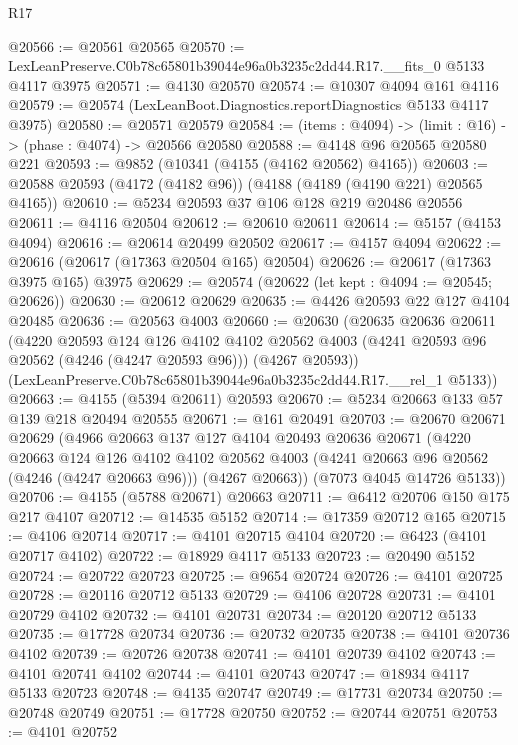 \begin{lexlean}{R17}
\begin{coremodule}
@20566 := @20561 @20565
@20570 := LexLeanPreserve.C0b78c65801b39044e96a0b3235c2dd44.R17.__fits_0 @5133 @4117 @3975
@20571 := @4130 @20570
@20574 := @10307 @4094 @161 @4116
@20579 := @20574 (LexLeanBoot.Diagnostics.reportDiagnostics @5133 @4117 @3975)
@20580 := @20571 @20579
@20584 := (items : @4094) -> (limit : @16) -> (phase : @4074) -> @20566 @20580
@20588 := @4148 @96 @20565 @20580 @221
@20593 := @9852 (@10341 (@4155 (@4162 @20562) @4165))
@20603 := @20588 @20593 (@4172 (@4182 @96)) (@4188 (@4189 (@4190 @221) @20565 @4165))
@20610 := @5234 @20593 @37 @106 @128 @219 @20486 @20556
@20611 := @4116 @20504
@20612 := @20610 @20611
@20614 := @5157 (@4153 @4094)
@20616 := @20614 @20499 @20502
@20617 := @4157 @4094
@20622 := @20616 (@20617 (@17363 @20504 @165) @20504)
@20626 := @20617 (@17363 @3975 @165) @3975
@20629 := @20574 (@20622 (let kept : @4094 := @20545; @20626))
@20630 := @20612 @20629
@20635 := @4426 @20593 @22 @127 @4104 @20485
@20636 := @20563 @4003
@20660 := @20630
    (@20635
      @20636
      @20611
      (@4220
        @20593
        @124
        @126
        @4102
        @4102
        @20562
        @4003
        (@4241 @20593 @96 @20562 (@4246 (@4247 @20593 @96)))
        (@4267 @20593))
      (LexLeanPreserve.C0b78c65801b39044e96a0b3235c2dd44.R17.__rel_1 @5133))
@20663 := @4155 (@5394 @20611) @20593
@20670 := @5234 @20663 @133 @57 @139 @218 @20494 @20555
@20671 := @161 @20491
@20703 := @20670
    @20671
    @20629
    (@4966
      @20663
      @137
      @127
      @4104
      @20493
      @20636
      @20671
      (@4220
        @20663
        @124
        @126
        @4102
        @4102
        @20562
        @4003
        (@4241 @20663 @96 @20562 (@4246 (@4247 @20663 @96)))
        (@4267 @20663))
      (@7073 @4045 @14726 @5133))
@20706 := @4155 (@5788 @20671) @20663
@20711 := @6412 @20706 @150 @175 @217 @4107
@20712 := @14535 @5152
@20714 := @17359 @20712 @165
@20715 := @4106 @20714
@20717 := @4101 @20715 @4104
@20720 := @6423 (@4101 @20717 @4102)
@20722 := @18929 @4117 @5133
@20723 := @20490 @5152
@20724 := @20722 @20723
@20725 := @9654 @20724
@20726 := @4101 @20725
@20728 := @20116 @20712 @5133
@20729 := @4106 @20728
@20731 := @4101 @20729 @4102
@20732 := @4101 @20731
@20734 := @20120 @20712 @5133
@20735 := @17728 @20734
@20736 := @20732 @20735
@20738 := @4101 @20736 @4102
@20739 := @20726 @20738
@20741 := @4101 @20739 @4102
@20743 := @4101 @20741 @4102
@20744 := @4101 @20743
@20747 := @18934 @4117 @5133 @20723
@20748 := @4135 @20747
@20749 := @17731 @20734
@20750 := @20748 @20749
@20751 := @17728 @20750
@20752 := @20744 @20751
@20753 := @4101 @20752

\end{coremodule}
\end{lexlean}
